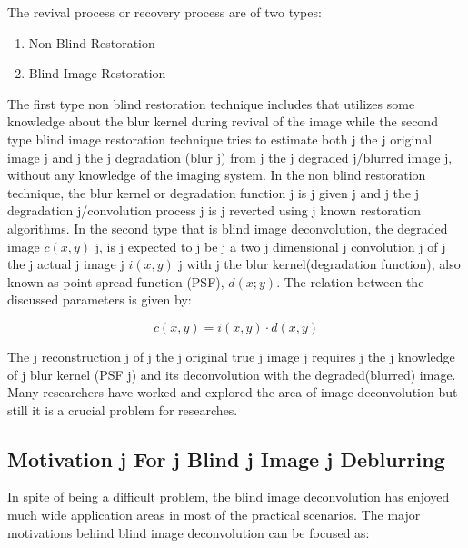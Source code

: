 \documentclass{article}
\begin{document}
The revival process or recovery process are of two types: 
\begin{enumerate}
    \item Non Blind Restoration
    \item Blind Image Restoration
\end{enumerate}

The first type non blind restoration technique includes that utilizes some knowledge about the blur kernel during revival of the image while the second type blind image restoration technique tries to estimate both{\color{white} j} the{\color{white} j} original image{\color{white} j} and{\color{white} j} the{\color{white} j} degradation (blur{\color{white} j}) from{\color{white} j} the{\color{white} j} degraded{\color{white} j}/blurred image{\color{white} j}, without any knowledge of the imaging system. In the non blind restoration technique, the blur kernel or degradation function{\color{white} j} is{\color{white} j} given{\color{white} j} and{\color{white} j} the{\color{white} j} degradation{\color{white} j}/convolution process{\color{white} j} is{\color{white} j} reverted using{\color{white} j} known restoration algorithms. In the second type that is blind image deconvolution, the degraded image $c(x, y)${\color{white} j}, is{\color{white} j} expected to{\color{white} j} be{\color{white} j} a two{\color{white} j} dimensional{\color{white} j} convolution{\color{white} j} of{\color{white} j} the{\color{white} j} actual{\color{white} j} image{\color{white} j} $i(x, y)${\color{white} j} with{\color{white} j} the blur kernel(degradation function), also known as point spread function (PSF), $d(x; y)$. The relation between the discussed parameters is given by:

\begin{equation}
    c(x, y) = i(x, y) \cdot d(x, y) 
\end{equation}

The{\color{white} j} reconstruction{\color{white} j} of{\color{white} j} the{\color{white} j} original true{\color{white} j} image{\color{white} j} requires{\color{white} j} the{\color{white} j} knowledge of{\color{white} j} blur kernel (PSF{\color{white} j}) and its deconvolution with the degraded(blurred) image. Many researchers have worked and explored the area of image deconvolution but still it is a crucial problem for researches. 

\subsection{Motivation{\color{white} j} For{\color{white} j} Blind{\color{white} j} Image{\color{white} j} Deblurring}
In spite of being a difficult problem, the blind image deconvolution has enjoyed much wide application areas in most of the practical scenarios. The major motivations behind blind image deconvolution can be focused as: 
\end{document}
